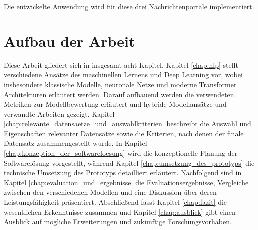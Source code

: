 Die entwickelte Anwendung wird für diese drei Nachrichtenportale implementiert.

\section{Aufbau der Arbeit}
\label{sec:aufbau}

Diese Arbeit gliedert sich in insgesamt acht Kapitel. 
Kapitel \ref{chap:nlp} stellt verschiedene Ansätze des maschinellen Lernens und Deep Learning vor, 
wobei insbesondere klassische Modelle, neuronale Netze und moderne Transformer Architekturen erläutert werden. 
Darauf aufbauend werden die verwendeten Metriken zur Modellbewertung erläutert und hybride Modellansätze und verwandte Arbeiten gezeigt.
Kapitel \ref{chap:relevante_datensaetze_und_auswahlkriterien} beschreibt die Auswahl und Eigenschaften relevanter Datensätze sowie die Kriterien, 
nach denen der finale Datensatz zusammengestellt wurde. 
In Kapitel \ref{chap:konzeption_der_softwareloesung} wird die konzeptionelle Planung der Softwarelösung vorgestellt, 
während Kapitel \ref{chap:umsetzung_des_prototyps} die technische Umsetzung des Prototyps detailliert erläutert.
Nachfolgend sind in Kapitel \ref{chap:evaluation_und_ergebnisse} die Evaluationsergebnisse, Vergleiche zwischen den verschiedenen Modellen und 
eine Diskussion über deren Leistungsfähigkeit präsentiert.
Abschließend fasst Kapitel \ref{chap:fazit} die wesentlichen Erkenntnisse zusammen und 
Kapitel \ref{chap:ausblick} gibt einen Ausblick auf mögliche Erweiterungen und zukünftige Forschungsvorhaben.



